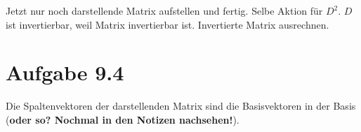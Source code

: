 \documentclass[a4paper,german,12pt,smallheadings]{scrartcl}
\begin{document}
Jetzt nur noch darstellende Matrix aufstellen und fertig. Selbe Aktion für $D^2$. $D$ ist invertierbar, weil Matrix invertierbar ist. Invertierte Matrix ausrechnen.

\section*{Aufgabe 9.4}

Die Spaltenvektoren der darstellenden Matrix sind die Basisvektoren in der Basis (\textbf{oder so? Nochmal in den Notizen nachsehen!}).
\end{document}
